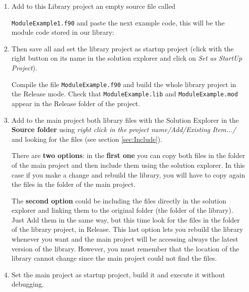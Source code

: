 \begin{enumerate}
\begin{enumerate}
		\item Add to this Library project an empty source file called 
		
		\texttt{ModuleExample1.f90} and paste the next example code, this will be the module code stored in our library:	
        
        \vspace{0.5cm}
        		
		
		\item Then save all and set the library project as startup project (click with the right button on its name in the solution explorer 
		and click on \textit{Set as StartUp Project}). 
		
		Compile the file \texttt{ModuleExample.f90} and build the whole library project in the Release mode. Check that 
		\texttt{ModuleExample.lib} and \texttt{ModuleExample.mod} appear in the Release folder of the project.
        
		\item Add to the main project both library files with the Solution Explorer in the \textbf{Source folder} using \textit{right click in the project name/Add/Existing Item.../} and looking for the files (see section \ref{sec:Include}).
        
        There are \textbf{two options}: in the \textbf{first one} you can copy both files in the folder of the main project and then include them using the solution explorer. In this case if you make a change and rebuild the library, you will have to copy again the files in the folder of the main project.
        
        The \textbf{second option} could be including the files directly in the solution explorer and linking them to the original folder (the folder of the library). Just Add them in the same way, but this time look for the files in the folder of the library project, in Release. This last option lets you rebuild the library whenever you want and the main project will be accessing always the latest version of the library. However, you must remember that the location of the library cannot change since the main project could not find the files. 

		\item Set the main project as startup project, build it and execute it without debugging. 
        
	\end{enumerate}
	

\end{enumerate}
